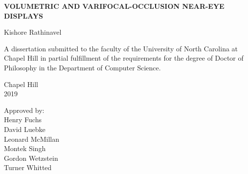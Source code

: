 \begin{titlepage}
\begin{center}


\vspace{2in}
\begin{singlespace}
\Large \bf
VOLUMETRIC AND VARIFOCAL-OCCLUSION NEAR-EYE DISPLAYS 
\end{singlespace}


\vspace{61pt} %
\large Kishore Rathinavel
\end{center}



\vspace{50pt}
\begin{singlespace}
\noindent \large
A dissertation submitted to the faculty of the University of North Carolina at Chapel Hill
in partial fulfillment of the requirements for the degree of Doctor of Philosophy in
the Department of Computer Science.
\end{singlespace}


\vspace{50pt}
\begin{center}
\begin{singlespace} \large
Chapel Hill\\
2019
\end{singlespace}
\end{center}


\vfill
\begin{flushright}
\begin{minipage}[t]{1.5in} \large
Approved by:\\
Henry Fuchs\\
David Luebke\\
Leonard McMillan\\
Montek Singh\\
Gordon Wetzstein\\
Turner Whitted
\end{minipage}
\end{flushright}

\end{titlepage}